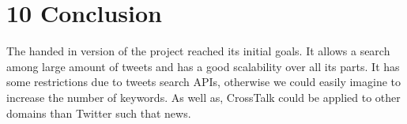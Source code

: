 \chapter*{10    Conclusion}
\setcounter{chapter}{10}
\setcounter{section}{0}

The handed in version of the project reached its initial goals. It allows a search among large amount of tweets and has a good scalability over all its parts. It has some restrictions due to tweets search APIs, otherwise we could easily imagine to increase the number of keywords. As well as, CrossTalk could be applied to other domains than Twitter such that news.